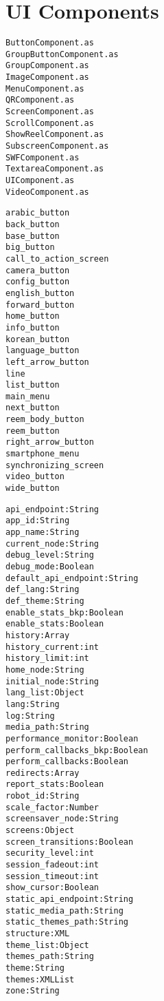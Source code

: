 \chapter{UI Components}
\label{chap:app-uicomponents}



\begin{lstlisting}[caption=Basic UI Components, label=uicomponents-list]
ButtonComponent.as
GroupButtonComponent.as
GroupComponent.as
ImageComponent.as
MenuComponent.as
QRComponent.as
ScreenComponent.as
ScrollComponent.as
ShowReelComponent.as
SubscreenComponent.as
SWFComponent.as
TextareaComponent.as
UIComponent.as
VideoComponent.as
\end{lstlisting}

\begin{lstlisting}[caption=Theme UI Components, label=uithemecomponents-list]
arabic_button
back_button
base_button
big_button
call_to_action_screen
camera_button
config_button
english_button
forward_button
home_button
info_button
korean_button
language_button
left_arrow_button
line
list_button
main_menu
next_button
reem_body_button
reem_button
right_arrow_button
smartphone_menu
synchronizing_screen
video_button
wide_button
\end{lstlisting}

\begin{lstlisting}[caption=Application State (Settings class), label=config-list]
api_endpoint:String
app_id:String
app_name:String
current_node:String
debug_level:String
debug_mode:Boolean
default_api_endpoint:String
def_lang:String
def_theme:String
enable_stats_bkp:Boolean
enable_stats:Boolean
history:Array
history_current:int
history_limit:int
home_node:String
initial_node:String
lang_list:Object
lang:String
log:String
media_path:String
performance_monitor:Boolean
perform_callbacks_bkp:Boolean
perform_callbacks:Boolean
redirects:Array
report_stats:Boolean
robot_id:String
scale_factor:Number
screensaver_node:String
screens:Object
screen_transitions:Boolean
security_level:int
session_fadeout:int
session_timeout:int
show_cursor:Boolean
static_api_endpoint:String
static_media_path:String
static_themes_path:String
structure:XML
theme_list:Object
themes_path:String
theme:String
themes:XMLList
zone:String

\end{lstlisting}
